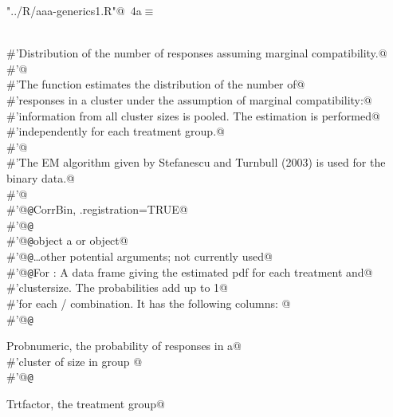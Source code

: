 \documentclass[reqno]{amsart}
\renewcommand{\NWtarget}[2]{\hypertarget{#1}{#2}}
\begin{document}
\begin{flushleft} \small
\begin{minipage}{\linewidth}\label{scrap4}\raggedright\small
\NWtarget{nuweb4a}{} \verb@"../R/aaa-generics1.R"@\nobreak\ {\footnotesize {4a}}$\equiv$
\vspace{-1ex}
\begin{list}{}{} \item
\mbox{}\verb@@\\
\mbox{}\verb@#'Distribution of the number of responses assuming marginal compatibility.@\\
\mbox{}\verb@#'@\\
\mbox{}\verb@#'The  function estimates the distribution of the number of@\\
\mbox{}\verb@#'responses in a cluster under the assumption of marginal compatibility:@\\
\mbox{}\verb@#'information from all cluster sizes is pooled. The estimation is performed@\\
\mbox{}\verb@#'independently for each treatment group.@\\
\mbox{}\verb@#'@\\
\mbox{}\verb@#'The EM algorithm given by Stefanescu and Turnbull (2003) is used for the binary data.@\\
\mbox{}\verb@#'@\\
\mbox{}\verb@#'@{\tt @}\verb@useDynLib CorrBin, .registration=TRUE@\\
\mbox{}\verb@#'@{\tt @}\verb@export@\\
\mbox{}\verb@#'@{\tt @}\verb@param object a  or  object@\\
\mbox{}\verb@#'@{\tt @}\verb@param \dots other potential arguments; not currently used@\\
\mbox{}\verb@#'@{\tt @}\verb@return For : A data frame giving the estimated pdf for each treatment and@\\
\mbox{}\verb@#'clustersize.  The probabilities add up to 1@\\
\mbox{}\verb@#'for each / combination. It has the following columns: @\\
\mbox{}\verb@#'@{\tt @}\verb@return \item{Prob}{numeric, the probability of  responses in a@\\
\mbox{}\verb@#'cluster of size  in group }@\\
\mbox{}\verb@#'@{\tt @}\verb@return \item{Trt}{factor, the treatment group}@\\

\end{list}
\end{minipage}
\end{flushleft}
\end{document}

